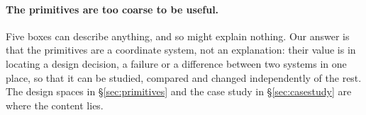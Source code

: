 \paragraph{The primitives are too coarse to be useful.} Five boxes can describe anything, and so might explain nothing. Our answer is that the primitives are a coordinate system, not an explanation: their value is in locating a design decision, a failure or a difference between two systems in one place, so that it can be studied, compared and changed independently of the rest. The design spaces in \S\ref{sec:primitives} and the case study in \S\ref{sec:casestudy} are where the content lies.

